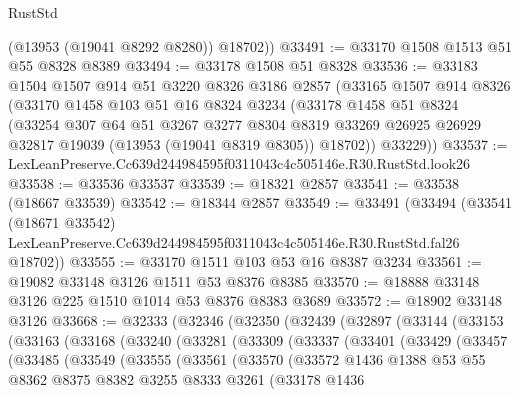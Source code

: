 \begin{lexlean}{RustStd}
\begin{coremodule}
        (@13953 (@19041 @8292 @8280))
        @18702))
@33491 := @33170 @1508 @1513 @51 @55 @8328 @8389
@33494 := @33178 @1508 @51 @8328
@33536 := @33183
    @1504
    @1507
    @914
    @51
    @3220
    @8326
    @3186
    @2857
    (@33165
      @1507
      @914
      @8326
      (@33170
        @1458
        @103
        @51
        @16
        @8324
        @3234
        (@33178
          @1458
          @51
          @8324
          (@33254
            @307
            @64
            @51
            @3267
            @3277
            @8304
            @8319
            @33269
            @26925
            @26929
            @32817
            @19039
            (@13953 (@19041 @8319 @8305))
            @18702))
        @33229))
@33537 := LexLeanPreserve.Cc639d244984595f0311043c4c505146e.R30.RustStd.look26
@33538 := @33536 @33537
@33539 := @18321 @2857
@33541 := @33538 (@18667 @33539)
@33542 := @18344 @2857
@33549 := @33491
    (@33494
      (@33541
        (@18671 @33542)
        LexLeanPreserve.Cc639d244984595f0311043c4c505146e.R30.RustStd.fal26
        @18702))
@33555 := @33170 @1511 @103 @53 @16 @8387 @3234
@33561 := @19082 @33148 @3126 @1511 @53 @8376 @8385
@33570 := @18888 @33148 @3126 @225 @1510 @1014 @53 @8376 @8383 @3689
@33572 := @18902 @33148 @3126
@33668 := @32333
    (@32346
      (@32350
        (@32439
          (@32897
            (@33144
              (@33153
                (@33163
                  (@33168
                    (@33240
                      (@33281
                        (@33309
                          (@33337
                            (@33401
                              (@33429
                                (@33457
                                  (@33485
                                    (@33549
                                      (@33555
                                        (@33561
                                          (@33570
                                            (@33572
                                              @1436
                                              @1388
                                              @53
                                              @55
                                              @8362
                                              @8375
                                              @8382
                                              @3255
                                              @8333
                                              @3261
                                              (@33178
                                                @1436

\end{coremodule}
\end{lexlean}
